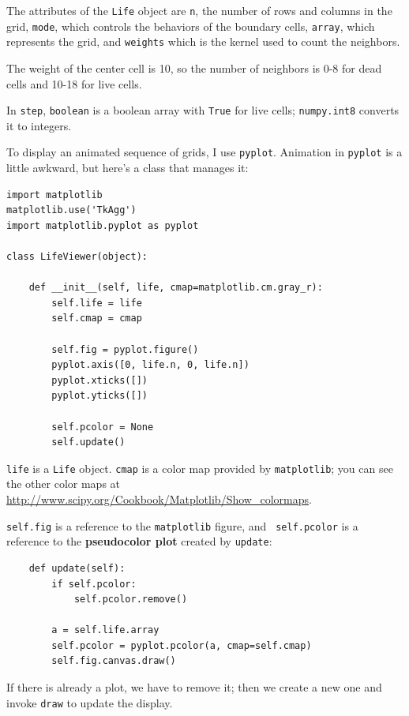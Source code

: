 \documentclass[10pt]{book}
\begin{document}
The attributes of the {\tt Life} object are {\tt n}, the number
of rows and columns in the grid, {\tt mode}, which controls the
behaviors of the boundary cells, {\tt array}, which represents
the grid, and {\tt weights} which is the kernel used to count
the neighbors.

The weight of the center cell is 10, so the number of neighbors
is 0-8 for dead cells and 10-18 for live cells.

In {\tt step}, {\tt boolean} is a boolean array with {\tt True}
for live cells;  {\tt numpy.int8} converts it to integers.

To display an animated sequence of grids, I use {\tt pyplot}.
Animation in {\tt pyplot} is a little awkward, but here's a class
that manages it:

\begin{verbatim}
import matplotlib
matplotlib.use('TkAgg')
import matplotlib.pyplot as pyplot

class LifeViewer(object):

    def __init__(self, life, cmap=matplotlib.cm.gray_r):
        self.life = life
        self.cmap = cmap

        self.fig = pyplot.figure()
        pyplot.axis([0, life.n, 0, life.n])
        pyplot.xticks([])
        pyplot.yticks([])

        self.pcolor = None
        self.update()
\end{verbatim}

{\tt life} is a {\tt Life} object.  {\tt cmap} is a color map
provided by {\tt matplotlib}; you can see the other
color maps at \url{http://www.scipy.org/Cookbook/Matplotlib/Show_colormaps}.

{\tt self.fig} is a reference to the {\tt matplotlib} figure, and {\tt
  self.pcolor} is a reference to the {\bf pseudocolor plot} created by
{\tt update}:

\begin{verbatim}
    def update(self):
        if self.pcolor:
            self.pcolor.remove()

        a = self.life.array
        self.pcolor = pyplot.pcolor(a, cmap=self.cmap)
        self.fig.canvas.draw()
\end{verbatim}

If there is already a plot, we have to remove it; then we create
a new one and invoke {\tt draw} to update the display.
\end{document}
